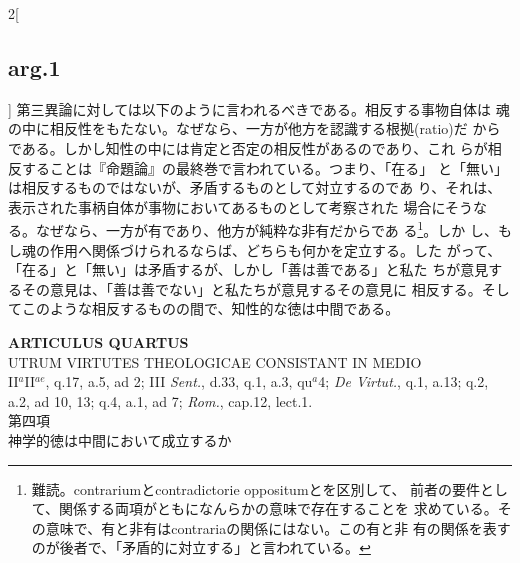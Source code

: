 \documentclass[paper=a4paper,fontsize=10pt,jafontsize=9pt,titlepage]{jlreq}
\begin{document}
\begin{paracol}{2}[\subsection{arg.1}]
第三異論に対しては以下のように言われるべきである。相反する事物自体は
 魂の中に相反性をもたない。なぜなら、一方が他方を認識する根拠(ratio)だ
 からである。しかし知性の中には肯定と否定の相反性があるのであり、これ
 らが相反することは『命題論』の最終巻で言われている。つまり、「在る」
 と「無い」は相反するものではないが、矛盾するものとして対立するのであ
 り、それは、表示された事柄自体が事物においてあるものとして考察された
 場合にそうなる。なぜなら、一方が有であり、他方が純粋な非有だからであ
 る\footnote{難読。contrariumとcontradictorie oppositumとを区別して、
 前者の要件として、関係する両項がともになんらかの意味で存在することを
 求めている。その意味で、有と非有はcontrariaの関係にはない。この有と非
 有の関係を表すのが後者で、「矛盾的に対立する」と言われている。}。しか
 し、もし魂の作用へ関係づけられるならば、どちらも何かを定立する。した
 がって、「在る」と「無い」は矛盾するが、しかし「善は善である」と私た
 ちが意見するその意見は、「善は善でない」と私たちが意見するその意見に
 相反する。そしてこのような相反するものの間で、知性的な徳は中間である。

\end{paracol}
\newpage
{}
{}
\setcounter{section}{4}
\setcounter{subsection}{0}


\begin{center}
{\Large {\bfseries ARTICULUS QUARTUS}}\\
{\large UTRUM VIRTUTES THEOLOGICAE CONSISTANT IN MEDIO}\\
{\footnotesize II$^{a}$II$^{ae}$, q.17, a.5, ad 2; III {\itshape Sent.}, d.33, q.1, a.3, qu$^{a}$}4; {\itshape De Virtut.}, q.1, a.13; q.2, a.2, ad 10, 13; q.4, a.1, ad 7; {\itshape Rom.}, cap.12, lect.1.\\
{\Large 第四項\\神学的徳は中間において成立するか}
\end{center}
\end{document}
